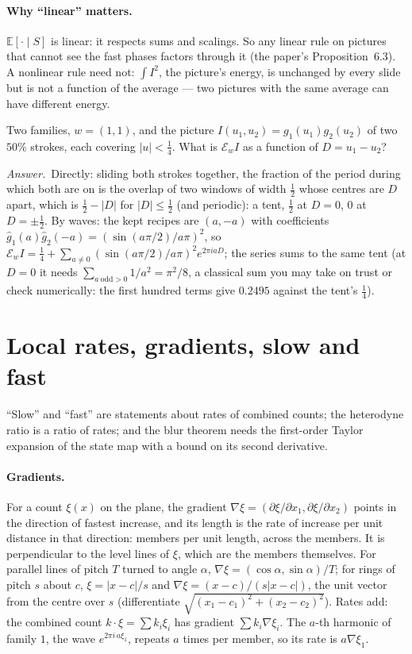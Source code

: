 \documentclass[10pt]{article}
\theoremstyle{plain}
\theoremstyle{definition}
\newcommand{\answer}{\par\smallskip\noindent\textit{Answer.}\ }
\newcommand{\E}{\mathbb{E}}
\newcommand{\cnt}{\xi}
\begin{document}
\paragraph{Why ``linear'' matters.}
$\E[\cdot\mid S]$ is linear: it respects sums and scalings. So any linear
rule on pictures that cannot see the fast phases factors through it (the
paper's Proposition~6.3). A nonlinear rule need not: $\int I^2$, the
picture's energy, is unchanged by every slide but is not a function of the
average --- two pictures with the same average can have different energy.

\begin{checkyourself}
Two families, $w=(1,1)$, and the picture $I(u_1,u_2)=g_1(u_1)g_2(u_2)$ of two
$50\%$ strokes, each covering $|u|<\tfrac14$. What is $\mathcal E_wI$ as a
function of $D=u_1-u_2$?
\answer Directly: sliding both strokes together, the fraction of the period
during which both are on is the overlap of two windows of width $\tfrac12$
whose centres are $D$ apart, which is $\tfrac12-|D|$ for $|D|\le\tfrac12$
(and periodic): a tent, $\tfrac12$ at $D=0$, $0$ at $D=\pm\tfrac12$. By
waves: the kept recipes are $(a,-a)$ with coefficients
$\hat g_1(a)\hat g_2(-a)=(\sin(a\pi/2)/a\pi)^2$, so
$\mathcal E_wI=\tfrac14+\sum_{a\ne0}(\sin(a\pi/2)/a\pi)^2e^{2\pi iaD}$; the
series sums to the same tent (at $D=0$ it needs
$\sum_{a\ \text{odd}>0}1/a^2=\pi^2/8$, a classical sum you may take on trust
or check numerically: the first hundred terms give $0.2495$ against the
tent's $\tfrac14$).
\end{checkyourself}

\section{Local rates, gradients, slow and fast}
\label{p:rates}

\begin{why}
``Slow'' and ``fast'' are statements about rates of combined counts; the
heterodyne ratio is a ratio of rates; and the blur theorem needs the
first-order Taylor expansion of the state map with a bound on its second
derivative.
\end{why}

\paragraph{Gradients.}
For a count $\cnt(x)$ on the plane, the gradient
$\nabla\cnt=(\partial\cnt/\partial x_1,\partial\cnt/\partial x_2)$ points in
the direction of fastest increase, and its length is the rate of increase
per unit distance in that direction: members per unit length, across the
members. It is perpendicular to the level lines of $\cnt$, which are the
members themselves. For parallel lines of pitch $T$ turned to angle
$\alpha$, $\nabla\cnt=(\cos\alpha,\sin\alpha)/T$; for rings of pitch $s$
about $c$, $\cnt=|x-c|/s$ and $\nabla\cnt=(x-c)/(s|x-c|)$, the unit vector
from the centre over $s$ (differentiate $\sqrt{(x_1-c_1)^2+(x_2-c_2)^2}$).
Rates add: the combined count $k\cdot\cnt=\sum k_i\cnt_i$ has gradient
$\sum k_i\nabla\cnt_i$. The $a$-th harmonic of family $1$, the wave
$e^{2\pi i\,a\cnt_1}$, repeats $a$ times per member, so its rate is
$a\nabla\cnt_1$.
\end{document}
